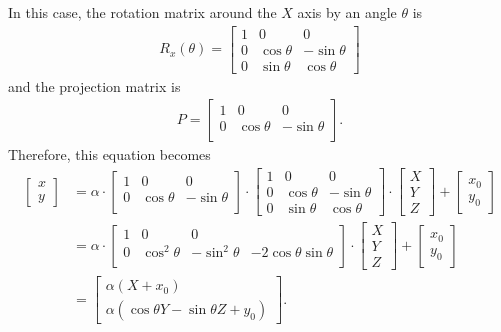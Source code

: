 \documentclass[a4paper]{article}
\begin{document}
In this case, the rotation matrix around the $X$ axis by an angle $\theta$ is 
\begin{align*}
    R_x(\theta) = \begin{bmatrix}
    1 & 0 & 0 \\
    0 & \cos \theta & -\sin \theta \\
    0 & \sin \theta & \cos \theta
    \end{bmatrix}
\end{align*}
and the projection matrix is
\begin{align*}
    P = \begin{bmatrix}
        1 & 0 & 0 \\
        0 & \cos \theta & -\sin \theta \\
    \end{bmatrix}.
\end{align*}
Therefore, this equation becomes
\begin{align*}
    \begin{bmatrix}
        x \\ y
    \end{bmatrix}
    &= \alpha \cdot \begin{bmatrix}
        1 & 0 & 0 \\
        0 & \cos \theta & -\sin \theta \\
    \end{bmatrix} \cdot \begin{bmatrix}
        1 & 0 & 0 \\
        0 & \cos \theta & -\sin \theta \\
        0 & \sin \theta & \cos \theta
        \end{bmatrix} \cdot \begin{bmatrix}
        X \\ Y \\ Z
    \end{bmatrix}
    + \begin{bmatrix}
        x_0 \\ y_0
    \end{bmatrix}
    \\ &= \alpha \cdot
    \begin{bmatrix}
        1 & 0 & 0 \\
        0 & \cos^2 \theta & -\sin^2 \theta & -2 \cos \theta \sin \theta \\
    \end{bmatrix}\cdot \begin{bmatrix}
        X \\ Y \\ Z
    \end{bmatrix}+ \begin{bmatrix}
        x_0 \\ y_0
    \end{bmatrix}
    \\ &= \begin{bmatrix}
        \alpha (X + x_0) \\
        \alpha (\cos \theta Y - \sin \theta Z + y_0)
    \end{bmatrix}.
\end{align*}
\end{document}
